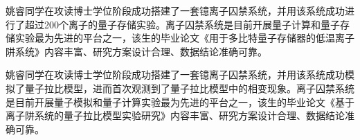 
\begin{comments}

  姚睿同学在攻读博士学位阶段成功搭建了一套镱离子囚禁系统，并用该系统成功进行了超过200个离子的量子存储实验。离子囚禁系统是目前开展量子计算和量子存储实验最为先进的平台之一，该生的毕业论文《用于多比特量子存储器的低温离子阱系统》内容丰富、研究方案设计合理、数据结论准确可靠。

  姚睿同学在攻读博士学位阶段成功搭建了一套镱离子囚禁系统，并用该系统成功模拟了量子拉比模型，进而首次观测到了量子拉比模型中的相变现象。离子囚禁系统是目前开展量子模拟和量子计算实验最为先进的平台之一，该生的毕业论文《基于离子阱系统的量子拉比模型实验研究》内容丰富、研究方案设计合理、数据结论准确可靠。

\end{comments}
